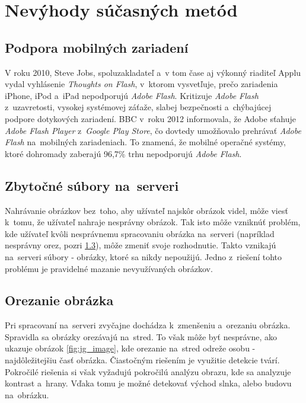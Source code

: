 \graphicspath{ {img/23/} }

\chapter{Nevýhody súčasných metód}
\section{Podpora mobilných zariadení}
\label{sec:mobile-support}

V roku 2010, Steve Jobs, spoluzakladateľ a~v tom čase aj výkonný riaditeľ Applu vydal vyhlásenie \emph{Thoughts on Flash}\cite{Apple_flash}, v~ktorom vysvetľuje, prečo zariadenia iPhone, iPod a~iPad nepodporujú \emph{Adobe Flash}. Kritizuje \emph{Adobe Flash} z~uzavretosti, vysokej systémovej záťaže, slabej bezpečnosti a~chýbajúcej podpore dotykových zariadení.
BBC v~roku 2012 informovala\cite{Android_flash}, že Adobe sťahuje \emph{Adobe Flash Player} z~\emph{Google Play Store}, čo dovtedy umožňovalo prehrávať \emph{Adobe Flash} na~mobilných zariadeniach. To znamená, že mobilné operačné systémy, ktoré dohromady zaberajú 96,7\% trhu\cite{Mobile_OS_share} nepodporujú \emph{Adobe Flash}.


\section{Zbytočné súbory na~serveri}

Nahrávanie obrázkov bez~toho, aby užívateľ najskôr obrázok videl, môže viesť k~tomu, že užívateľ nahraje nesprávny obrázok. Tak isto môže vzniknúť problém, kde užívateľ kvôli nesprávnemu spracovaniu obrázka na~serveri (napríklad nesprávny orez, pozri \ref{sec:orezanie-obrazka}), môže zmeniť svoje rozhodnutie. Takto vznikajú na~serveri súbory - obrázky, ktoré sa nikdy nepoužijú. Jedno z~riešení tohto problému je pravidelné mazanie nevyužívaných obrázkov.   

\section{Orezanie obrázka}
\label{sec:orezanie-obrazka}

Pri spracovaní na~serveri zvyčajne dochádza k~zmenšeniu a~orezaniu obrázka. Spravidla sa obrázky orezávajú na~stred. To však môže byť nesprávne, ako ukazuje obrázok \ref{fig:jg_image}, kde orezanie na~stred odreže osobu - najdôležitejšiu časť obrázka. Čiastočným riešením je využitie detekcie tvárí. Pokročilé riešenia si však vyžadujú pokročilú analýzu obrazu, kde sa analyzuje kontrast a~hrany. Vďaka tomu je možné detekovať východ slnka, alebo budovu na~obrázku. 

